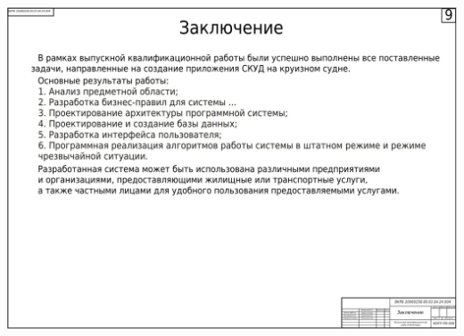 \begin{landscape}
\begin{плакат}
	\includegraphics[width=0.82\linewidth]{images/плакат9}
	\label{fig:9}
\end{плакат}


\end{landscape}
